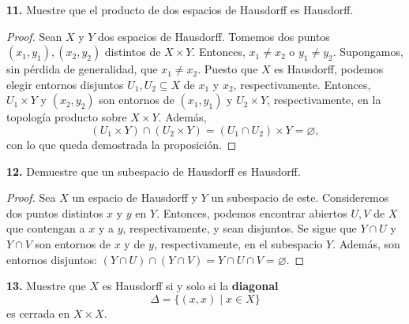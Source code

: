 \documentclass{article}
\begin{document}
\begin{mybox}
\textbf{11. } Muestre que el producto de dos espacios de Hausdorff es Hausdorff. 	
\end{mybox}	
\begin{proof}
	Sean $X$ y $Y$ dos espacios de Hausdorff. Tomemos dos puntos $(x_{1}, y_{1}), (x_{2}, y_{2})$ distintos de $X \times Y$. Entonces, $x_{1} \neq x_{2}$ o $y_{1} \neq y_{2}$. Supongamos, sin pérdida de generalidad, que $x_{1} \neq x_{2}$. Puesto que $X$ es Hausdorff, podemos elegir entornos disjuntos $U_{1}, U_{2} \subseteq X$ de $x_{1}$ y $x_{2}$, respectivamente.  Entonces, $U_{1} \times Y$ y $(x_{2}, y_{2})$ son entornos de $(x_{1}, y_{1})$ y $U_{2} \times Y$, respectivamente, en la topología producto sobre $X \times Y$. Además, 
	$$ \left( U_{1} \times Y \right) \cap \left( U_{2} \times Y \right) =   \left( U_{1} \cap U_{2} \right) \times Y = \varnothing, $$
	con lo que queda demostrada la proposición. 
\end{proof}

\begin{mybox}
	\textbf{12. } Demuestre que un subespacio de Hausdorff es Hausdorff. 
\end{mybox}	
\begin{proof}
	Sea $X$ un espacio de Hausdorff y $Y$ un subespacio de este. Consideremos dos puntos distintos $x$ y $y$ en $Y$. Entonces, podemos encontrar abiertos $U, V$ de $X$ que contengan a $x$ y a $y$, respectivamente, y sean disjuntos. Se sigue que $Y \cap U$ y $Y \cap V$ son entornos de $x$ y de $y$, respectivamente, en el subespacio $Y$. Además, son entornos disjuntos: $(Y \cap U) \cap (Y \cap V) = Y \cap U \cap V = \varnothing.$
\end{proof}

\begin{mybox}
	\textbf{13. } Muestre que $X$ es Hausdorff si y solo si la \textbf{diagonal}
	$$ \Delta = \{ (x, x) \mid x \in X \} $$
	es cerrada en $ X \times X$.
\end{mybox}	
\end{document}
